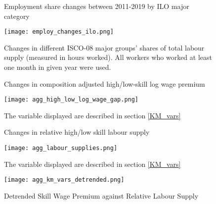 \documentclass{article}
\begin{document}
\begin{figure}[!htbp]%
\centering
    \caption{Employment share changes between 2011-2019 by ILO major category}
    {\texttt{[image: employ\_changes\_ilo.png]} }
    \caption*{\footnotesize Changes in different ISCO-08 major groups' shares of total labour supply (measured in hours worked). All workers who worked at least one month in given year were used.}
\label{employ_changes_ilo}
\end{figure}


\begin{figure}[!htbp]%
    \centering
    \caption{Changes in composition adjusted high/low-skill log wage premium}
    {\texttt{[image: agg\_high\_low\_log\_wage\_gap.png]} }
    \label{agg_high_low_log_wage_gap}
    \caption*{\footnotesize The variable displayed are described in section \ref{KM_vars}}
\end{figure}

\begin{figure}[!htbp]%
    \centering
    \caption{Changes in relative high/low skill labour supply}
    {\texttt{[image: agg\_labour\_supplies.png]} }
    \label{agg_labour_supplies}
    \caption*{\footnotesize The variable displayed are described in section \ref{KM_vars}}
\end{figure}


\begin{figure}[!htbp]%
    \centering
    \caption{Detrended Skill Wage Premium against Relative Labour Supply}
    {\texttt{[image: agg\_km\_vars\_detrended.png]} }
    \label{agg_km_vars_detrended}
\end{figure}
\end{document}
